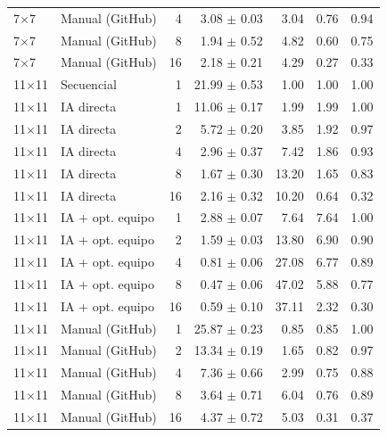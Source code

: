 \begin{tabular}{llrrrrr}
7$\times$7 & Manual (GitHub) & 4 & 3.08 $\pm$ 0.03 & 3.04 & 0.76 & 0.94 \\
7$\times$7 & Manual (GitHub) & 8 & 1.94 $\pm$ 0.52 & 4.82 & 0.60 & 0.75 \\
7$\times$7 & Manual (GitHub) & 16 & 2.18 $\pm$ 0.21 & 4.29 & 0.27 & 0.33 \\
\midrule
11$\times$11 & Secuencial & 1 & 21.99 $\pm$ 0.53 & 1.00 & 1.00 & 1.00 \\
11$\times$11 & IA directa & 1 & 11.06 $\pm$ 0.17 & 1.99 & 1.99 & 1.00 \\
11$\times$11 & IA directa & 2 & 5.72 $\pm$ 0.20 & 3.85 & 1.92 & 0.97 \\
11$\times$11 & IA directa & 4 & 2.96 $\pm$ 0.37 & 7.42 & 1.86 & 0.93 \\
11$\times$11 & IA directa & 8 & 1.67 $\pm$ 0.30 & 13.20 & 1.65 & 0.83 \\
11$\times$11 & IA directa & 16 & 2.16 $\pm$ 0.32 & 10.20 & 0.64 & 0.32 \\
11$\times$11 & IA + opt. equipo & 1 & 2.88 $\pm$ 0.07 & 7.64 & 7.64 & 1.00 \\
11$\times$11 & IA + opt. equipo & 2 & 1.59 $\pm$ 0.03 & 13.80 & 6.90 & 0.90 \\
11$\times$11 & IA + opt. equipo & 4 & 0.81 $\pm$ 0.06 & 27.08 & 6.77 & 0.89 \\
11$\times$11 & IA + opt. equipo & 8 & 0.47 $\pm$ 0.06 & 47.02 & 5.88 & 0.77 \\
11$\times$11 & IA + opt. equipo & 16 & 0.59 $\pm$ 0.10 & 37.11 & 2.32 & 0.30 \\
11$\times$11 & Manual (GitHub) & 1 & 25.87 $\pm$ 0.23 & 0.85 & 0.85 & 1.00 \\
11$\times$11 & Manual (GitHub) & 2 & 13.34 $\pm$ 0.19 & 1.65 & 0.82 & 0.97 \\
11$\times$11 & Manual (GitHub) & 4 & 7.36 $\pm$ 0.66 & 2.99 & 0.75 & 0.88 \\
11$\times$11 & Manual (GitHub) & 8 & 3.64 $\pm$ 0.71 & 6.04 & 0.76 & 0.89 \\
11$\times$11 & Manual (GitHub) & 16 & 4.37 $\pm$ 0.72 & 5.03 & 0.31 & 0.37 \\
\bottomrule
\end{tabular}
